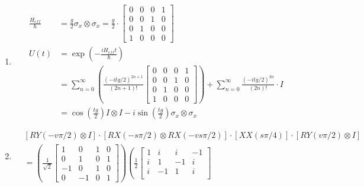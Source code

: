 \documentclass{article}
\begin{document}
\bigskip
\begin{prob}
\end{prob}
\begin{enumerate}[label=(\alph*)]
    \item \begin{align*}
            \frac{H_{eff}}{\hbar} &= \frac{g}{2} \sigma_x \otimes \sigma_x = \frac{g}{2} \cdot \begin{bmatrix}
            0 & 0 & 0 & 1 \\
            0 & 0 & 1 & 0 \\
            0 & 1 & 0 & 0 \\
            1 & 0 & 0 & 0
        \end{bmatrix} \\
                U(t) &= \exp \left( - \frac{i H_{eff} t}{\hbar} \right) \\
                     &= \sum_{n=0}^\infty \left( \frac{(-itg/2)^{2n+1}}{(2n+1)!} \begin{bmatrix}
            0 & 0 & 0 & 1 \\
            0 & 0 & 1 & 0 \\
            0 & 1 & 0 & 0 \\
            1 & 0 & 0 & 0
    \end{bmatrix} \right) + \sum_{n=0}^\infty \frac{(-itg/2)^{2n}}{(2n)!} \cdot I \\
                     &= \cos \left( \frac{tg}{2} \right) I \otimes I - i \sin \left( \frac{tg}{2} \right) \sigma_x \otimes \sigma_x
    \end{align*}
\item \begin{align*}
            & \left[ RY(-v\pi/2) \otimes I \right] \cdot \left[ RX(-s\pi/2) \otimes RX(-vs\pi/2) \right] \cdot \left[ XX(s\pi/4) \right] \cdot \left[ RY(v \pi/2) \otimes I \right] \\
            &= \left( \frac{1}{\sqrt{2}} \begin{bmatrix}
            1 & 0 & 1 & 0 \\
            0 & 1 & 0 & 1 \\
            -1 & 0 & 1 & 0 \\
            0 & -1 & 0 & 1
    \end{bmatrix} \right) \left( \frac{1}{2} \begin{bmatrix}
            1 & i & i & -1 \\
            i & 1 & -1 & i \\
            i & -1 & 1 & i \\

\end{bmatrix}
\end{align*}
\end{enumerate}
\end{document}
